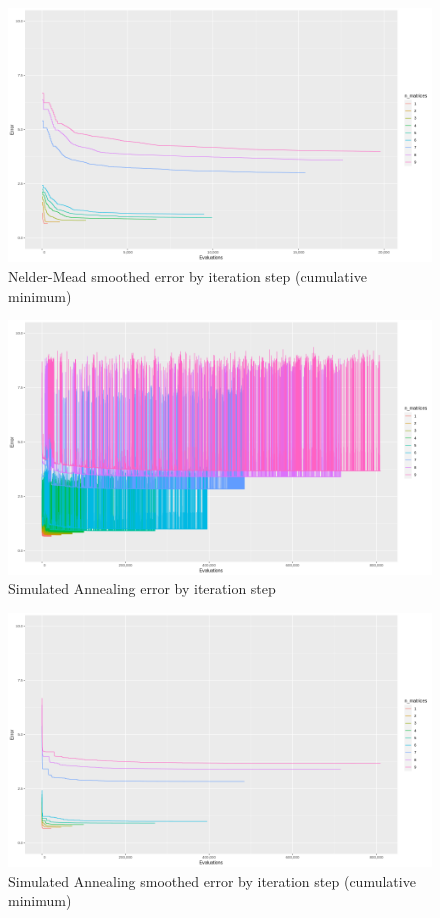 \begin{figure}[!htb]
\centering
\includegraphics[width=\textwidth]{figures/alg_nelder-mead_smoothed}
\decoRule
\caption[Nelder-Mead (smoothed)]{Nelder-Mead smoothed error by iteration step (cumulative minimum)}
\label{fig:alg_nelder-mead_smoothed}
\end{figure}

\begin{figure}[!htb]
\centering
\includegraphics[width=\textwidth]{figures/alg_annealing}
\decoRule
\caption[Simulated Annealing]{Simulated Annealing error by iteration step}
\label{fig:alg_annealing}
\end{figure}

\begin{figure}[!htb]
\centering
\includegraphics[width=\textwidth]{figures/alg_annealing_smoothed}
\decoRule
\caption[Simulated Annealing (smoothed)]{Simulated Annealing smoothed error by iteration step (cumulative minimum)}
\label{fig:alg_annealing_smoothed}
\end{figure}

